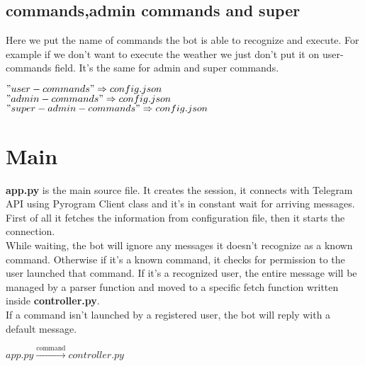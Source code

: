 \documentclass{article}
\begin{document}
\subsection{commands,admin commands and super}
Here we put the name of commands the bot is able to recognize and execute. For example if we don't want to execute the weather we just don't put it on user-commands field. It's the same for admin and super commands.
\begin{center} $"user-commands" \Rightarrow config.json$ \\
               $"admin-commands" \Rightarrow config.json$ \\
               $"super-admin-commands" \Rightarrow config.json$
\end{center}

\section{Main}
\textbf{app.py} is the main source file. It creates the session, it connects with Telegram API using Pyrogram Client class and it's in constant wait for arriving messages.\\
First of all it fetches the information from configuration file, then it starts the connection.\\
While waiting, the bot will ignore any messages it doesn't recognize as a known command. Otherwise if it's a known command, it checks for permission to the user launched that command. If it's a recognized user, the entire message will be managed by a parser function and moved to a specific fetch function written inside \textbf{controller.py}.\\
If a command isn't launched by a registered user, the bot will reply with a default message.
\begin{center} $app.py \xrightarrow{\text{command}} controller.py$ \end{center}

\end{document}
